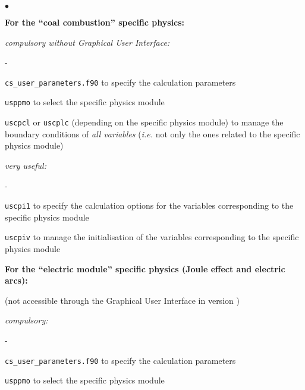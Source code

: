 {{{\begin{list}{$\bullet$}{}
\begin{list}{}{}
  \item{\bf For the ``coal combustion'' specific physics:}

    \begin{list}{}{}
        \item {\em compulsory without Graphical User Interface:}
        \begin{list}{-}{}
            \item \texttt{cs\_user\_parameters.f90} to specify the calculation parameters

            \item \texttt{usppmo} to select the specific physics module

            \item \texttt{uscpcl} or \texttt{uscplc} (depending on the
                  specific physics module) to manage the
                  boundary conditions of {\em all variables} ({\em i.e.} not only
              the ones related to the specific physics module)
        \end{list}

        \item {\em very useful:}
        \begin{list}{-}{}
            \item  \texttt{uscpi1}
               to specify the calculation options
                   for the variables
                   corresponding to the specific physics module

            \item \texttt{uscpiv} to manage the initialisation of the
                   variables corresponding to the specific physics module
        \end{list}
    \end{list}

     \item{\bf For the ``electric module'' specific physics
      (Joule effect and electric arcs):}

(not accessible through the Graphical User Interface in version \verscs)
    \begin{list}{}{}
       \item {\em compulsory:}
        \begin{list}{-}{}
            \item \texttt{cs\_user\_parameters.f90} to specify the calculation parameters

            \item \texttt{usppmo} to select the specific physics module


\end{list}
\end{list}
\end{list}
\end{list}}}}
